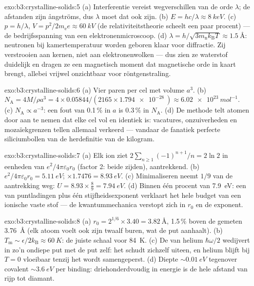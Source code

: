 \begin{solution}{exo:b3:crystalline-solids:5}
(a) Interferentie vereist wegverschillen van de orde $\lambda$;
de afstanden zijn ångströms, dus $\lambda$ moet dat ook zijn. (b) $E =
hc/\lambda \approx \qty{8}{keV}$. (c) $p = h/\lambda$, $V =
p^2/2m_{\text{e}}e \approx \qty{60}{kV}$ (de relativiteitstheorie scheelt een paar
procent) --- de bedrijfsspanning van een elektronenmicroscoop. (d)
$\lambda = h/\sqrt{3m_{\text{n}}k_{\text{B}}T} \approx
\qty{1.5}{\angstrom}$: neutronen bij kamertemperatuur worden geboren
klaar voor diffractie. Zij verstrooien aan kernen, niet aan elektronenwolken
--- dus zien ze waterstof duidelijk en dragen ze een magnetisch moment
dat magnetische orde in kaart brengt, allebei vrijwel onzichtbaar voor röntgenstraling.
\end{solution}

\begin{solution}{exo:b3:crystalline-solids:6}
(a) Vier paren per cel met volume $a^3$. (b) $N_{\text{A}} =
4M/\rho a^3 = 4\times0.05844/(2165\times\qty{1.794e-28}{})
\approx \qty{6.02e23}{mol^{-1}}$. (c) $N_{\text{A}} \propto
a^{-3}$: een fout van 0.1\,\% in $a$ is 0.3\,\% in $N_{\text{A}}$. (d)
De methode telt atomen door aan te nemen dat elke cel vol en
identiek is: vacatures, onzuiverheden en mozaïekgrenzen tellen allemaal
verkeerd --- vandaar de fanatiek perfecte siliciumbollen van de
herdefinitie van de kilogram.
\end{solution}

\begin{solution}{exo:b3:crystalline-solids:7}
(a) Elk ion ziet $2\sum_{n\ge1}(-1)^{n+1}/n = 2\ln2$ in eenheden van
$e^2/4\pi\varepsilon_0r_0$ (factor 2: beide zijden), aantrekkend. (b)
$e^2/4\pi\varepsilon_0r_0 = \qty{5.11}{eV}$; $\times1.7476 =
\qty{8.93}{eV}$. (c) Minimaliseren neemt $1/9$ van de aantrekking weg:
$U = 8.93\times\tfrac89 = \qty{7.94}{eV}$. (d) Binnen één procent
van \qty{7.9}{eV}: een  van puntladingen plus één stijfheidsexponent
verklaart het hele budget van een ionische vaste stof --- de kwantum\-mechanica
verstopt zich in $r_0$ en de exponent.
\end{solution}

\begin{solution}{exo:b3:crystalline-solids:8}
(a) $r_0 = 2^{1/6}\times3.40 = \qty{3.82}{\angstrom}$, 1.5\,\%
boven de gemeten \qty{3.76}{\angstrom} (elk atoom voelt ook
zijn twaalf buren, wat de put aanhaalt). (b)
$T_{\text{m}} \sim \epsilon/2k_{\text{B}} \approx \qty{60}{K}$:
de juiste schaal voor \qty{84}{K}. (c) De  van helium
$\hbar\omega/2$ wedijvert in zo'n ondiepe put met de put zelf: het
 schudt zichzelf uiteen, en helium blijft bij $T = 0$ vloeibaar
tenzij het wordt samengeperst. (d) Diepte $\sim\qty{0.01}{eV}$ tegenover covalent
$\sim\qty{3.6}{eV}$ per binding: driehonderdvoudig in energie is de
hele afstand van rijp tot diamant.
\end{solution}

